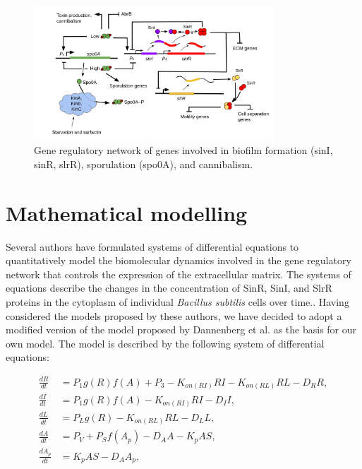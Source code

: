 \begin{figure}[h]
    \centering
    \includegraphics[width=0.8\textwidth]{figures/circuit.png}
    \caption{Gene regulatory network of genes involved in biofilm formation (sinI, sinR, slrR), sporulation (spo0A), and cannibalism.
    }
    \label{fig:circuit}
\end{figure}


\section{Mathematical modelling}\label{sec:litrev:theme2}
Several authors have formulated systems of differential equations to quantitatively model the biomolecular dynamics involved in the gene regulatory network that controls the expression of the extracellular matrix. The systems of equations describe the changes in the concentration of SinR, SinI, and SlrR proteins in the cytoplasm of individual \textit{Bacillus subtilis} cells over time.{\footnotesize\cite{simon}\cite{Voigt2005}\cite{Newman2013}\cite{Chen2023}\cite{Pedreira2021}\cite{Hallinan2010}}. Having considered the models proposed by these authors, we have decided to adopt a modified version of the model proposed by Dannenberg et al. {\footnotesize\cite{simon}} as the basis for our own model. The model is described by the following system of differential equations:

\begin{align}
\frac{dR}{dt} &= P_{1}g(R)f(A)+P_{3} - K_{on(RI)} R I - K_{on(RL)}RL  - D_{R} R, \label{eq:1} \\
\frac{dI}{dt} &= P_{1}g(R)f(A)  - K_{on(RI)} R I - D_{I} I, \label{eq:2} \\
\frac{dL}{dt} &= P_{L}g(R) - K_{on(RL)} RL - D_{L} L , \label{eq:3} \\
\frac{dA}{dt} &= P_V + P_S f(A_p) - D_A A - K_{p}A S , \label{eq:4} \\
\frac{dA_p}{dt} &= K_{p}A S - D_A A_p, \label{eq:5}
\end{align}

